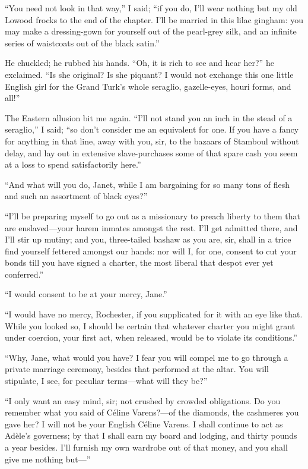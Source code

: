 \enquote{You need not look in that way,} I said; \enquote{if you do,
I'll wear nothing but my old Lowood frocks to the end of the chapter. 
I'll be married in this lilac gingham: you may make a dressing-gown for
yourself out of the pearl-grey silk, and an infinite series of
waistcoats out of the black satin.}

He chuckled; he rubbed his hands.  \enquote{Oh, it is rich to see and
hear her?} he exclaimed.  \enquote{Is she original?  Is she piquant?  I
would not exchange this one little English girl for the Grand Turk's
whole seraglio, gazelle-eyes, houri forms, and all!}

The Eastern allusion bit me again.  \enquote{I'll not stand you an inch
in the stead of a seraglio,} I said; \enquote{so don't consider me an
equivalent for one.  If you have a fancy for anything in that line, away
with you, sir, to the bazaars of Stamboul without delay, and lay out in
extensive slave-purchases some of that spare cash you seem at a loss to
spend satisfactorily here.}

\enquote{And what will you do, Janet, while I am bargaining for so many
tons of flesh and such an assortment of black eyes?}

\enquote{I'll be preparing myself to go out as a missionary to preach
liberty to them that are enslaved---your harem inmates amongst the
rest.  I'll get admitted there, and I'll stir up mutiny; and you,
three-tailed bashaw as you are, sir, shall in a trice find yourself
fettered amongst our hands: nor will I, for one, consent to cut your
bonds till you have signed a charter, the most liberal that despot ever
yet conferred.}

\enquote{I would consent to be at your mercy, Jane.}

\enquote{I would have no mercy, \Mr{} Rochester, if you supplicated for it
with an eye like that.  While you looked so, I should be certain that
whatever charter you might grant under coercion, your first act, when
released, would be to violate its conditions.}

\enquote{Why, Jane, what would you have?  I fear you will compel me to
go through a private marriage ceremony, besides that performed at the
altar.  You will stipulate, I see, for peculiar terms---what will they
be?}

\enquote{I only want an easy mind, sir; not crushed by crowded
obligations.  Do you remember what you said of Céline Varens?---of the
diamonds, the cashmeres you gave her?  I will not be your English Céline
Varens.  I shall continue to act as Adèle's governess; by that I shall
earn my board and lodging, and thirty pounds a year besides.  I'll
furnish my own wardrobe out of that money, and you shall give me nothing
but---}

